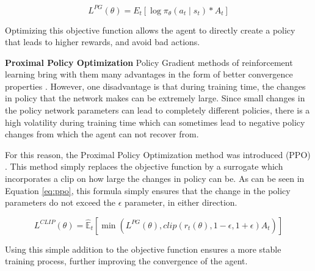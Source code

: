 \begin{equation} 
    L^{P G}(\theta)=E_{t}\left[\log \pi_{\theta}\left(a_{t} \mid s_{t}\right) * A_{t}\right]
    \label{eq:policygradientobjective}
\end{equation}

Optimizing this objective function allows the agent to directly create a policy that 
leads to higher rewards, and avoid bad actions. \newline

\noindent
\textbf{Proximal Policy Optimization } \newline
Policy Gradient methods of reinforcement learning 
bring with them many advantages in the form of better convergence properties \cite{policygradients}. 
However, one disadvantage is that during training time, the changes in policy that 
the network makes can be extremely large. Since small changes in the policy network 
parameters can lead to completely different policies, there is a high volatility during 
training time which can sometimes lead to negative policy changes from which the agent 
can not recover from. 

For this reason, the Proximal Policy Optimization method was introduced (PPO) \cite{ppo-paper}. 
This method simply replaces the objective function by a surrogate which incorporates a 
clip on how large the changes in policy can be. As can be seen in Equation \ref{eq:ppo}, 
this formula simply ensures that the change in the policy parameters do not exceed the 
$\epsilon$ parameter, in either direction. 

\begin{equation} 
    L^{C L I P}(\theta)=\hat{\mathbb{E}}_{t}\left[\min \left(L^{P G}(\theta), clip \left(r_{t}(\theta), 1-\epsilon, 1+\epsilon\right) \hat{A}_{t}\right)\right]
    \label{eq:ppo}
\end{equation}

Using this simple addition to the objective function ensures a more stable training process, 
further improving the convergence of the agent.  

